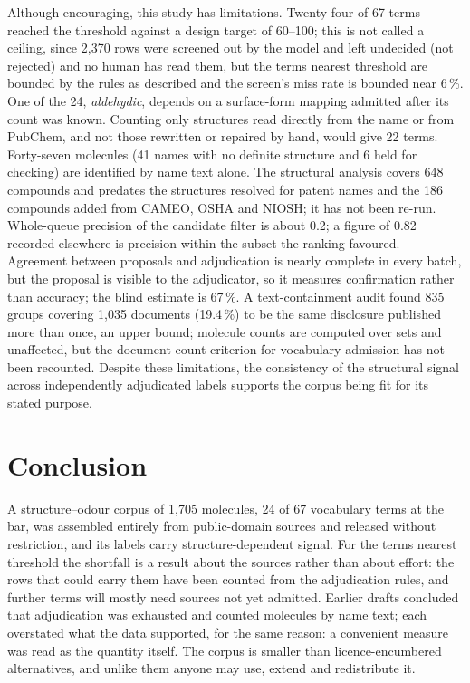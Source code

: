 \documentclass[
  computerscience
]{genesisl1-paper}
\begin{document}
\begin{GenesisLimitations}
Although encouraging, this study has limitations. Twenty-four of 67 terms reached the
threshold against a design target of 60--100; this is not called a ceiling, since 2{,}370
rows were screened out by the model and left undecided (not rejected) and no human has
read them, but the terms nearest threshold are bounded by the rules as
described and the screen's miss rate is bounded near 6\,\%. One of the 24,
\emph{aldehydic}, depends on a surface-form mapping admitted after its count was known.
Counting only structures read directly from the name or from PubChem, and not those
rewritten or repaired by hand, would give 22 terms. Forty-seven molecules (41 names with no
definite structure and 6 held for checking) are identified by name text alone. The
structural analysis covers 648 compounds and predates the structures resolved for patent
names and the 186 compounds added from CAMEO, OSHA and NIOSH; it has not been re-run.
Whole-queue precision of the candidate filter is about 0.2; a figure of 0.82 recorded
elsewhere is precision within the subset the ranking favoured. Agreement between
proposals and adjudication is nearly complete in every batch, but the proposal is visible
to the adjudicator, so it measures confirmation rather than accuracy; the blind estimate
is 67\,\%. A text-containment audit found 835 groups covering 1{,}035 documents (19.4\,\%)
to be the same disclosure published more than once, an upper bound; molecule counts are
computed over sets and unaffected, but the document-count criterion for vocabulary
admission has not been recounted. Despite these limitations, the consistency of the
structural signal across independently adjudicated labels supports the corpus being fit
for its stated purpose.
\end{GenesisLimitations}

\section{Conclusion}

A structure--odour corpus of 1{,}705 molecules, 24 of 67 vocabulary terms at the bar, was
assembled entirely from public-domain sources and released without restriction, and its
labels carry structure-dependent signal. For the terms nearest threshold the shortfall is
a result about the sources rather than about effort: the rows that could carry them have
been counted from the adjudication rules, and further terms will mostly need sources not
yet admitted. Earlier drafts concluded that adjudication was exhausted and counted
molecules by name text; each overstated what the data supported, for the same reason: a
convenient measure was read as the quantity itself. The corpus is smaller than licence-encumbered
alternatives, and unlike them anyone may use, extend and redistribute it.
\end{document}
